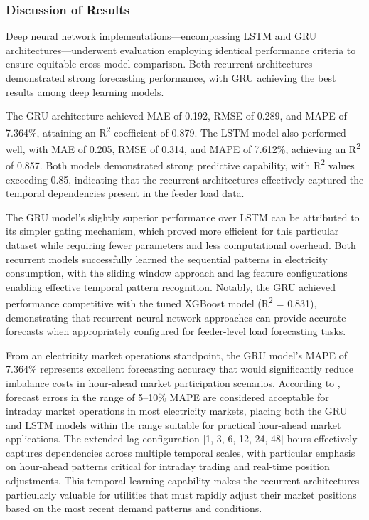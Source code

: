\documentclass[oneside, 12pt]{book}
\numberwithin{equation}{chapter}
\begin{document}
\subsubsection{Discussion of Results}

Deep neural network implementations---encompassing LSTM and GRU architectures---underwent evaluation employing identical performance criteria to ensure equitable cross-model comparison. Both recurrent architectures demonstrated strong forecasting performance, with GRU achieving the best results among deep learning models.

The GRU architecture achieved MAE of 0.192, RMSE of 0.289, and MAPE of 7.364\%, attaining an R\textsuperscript{2} coefficient of 0.879. The LSTM model also performed well, with MAE of 0.205, RMSE of 0.314, and MAPE of 7.612\%, achieving an R\textsuperscript{2} of 0.857. Both models demonstrated strong predictive capability, with R\textsuperscript{2} values exceeding 0.85, indicating that the recurrent architectures effectively captured the temporal dependencies present in the feeder load data.

The GRU model's slightly superior performance over LSTM can be attributed to its simpler gating mechanism, which proved more efficient for this particular dataset while requiring fewer parameters and less computational overhead. Both recurrent models successfully learned the sequential patterns in electricity consumption, with the sliding window approach and lag feature configurations enabling effective temporal pattern recognition. Notably, the GRU achieved performance competitive with the tuned XGBoost model (R\textsuperscript{2} = 0.831), demonstrating that recurrent neural network approaches can provide accurate forecasts when appropriately configured for feeder-level load forecasting tasks.

From an electricity market operations standpoint, the GRU model's MAPE of 7.364\% represents excellent forecasting accuracy that would significantly reduce imbalance costs in hour-ahead market participation scenarios. According to \parencite{lago2021dayahead}, forecast errors in the range of 5--10\% MAPE are considered acceptable for intraday market operations in most electricity markets, placing both the GRU and LSTM models within the range suitable for practical hour-ahead market applications. The extended lag configuration [1, 3, 6, 12, 24, 48] hours effectively captures dependencies across multiple temporal scales, with particular emphasis on hour-ahead patterns critical for intraday trading and real-time position adjustments. This temporal learning capability makes the recurrent architectures particularly valuable for utilities that must rapidly adjust their market positions based on the most recent demand patterns and conditions.
\end{document}
